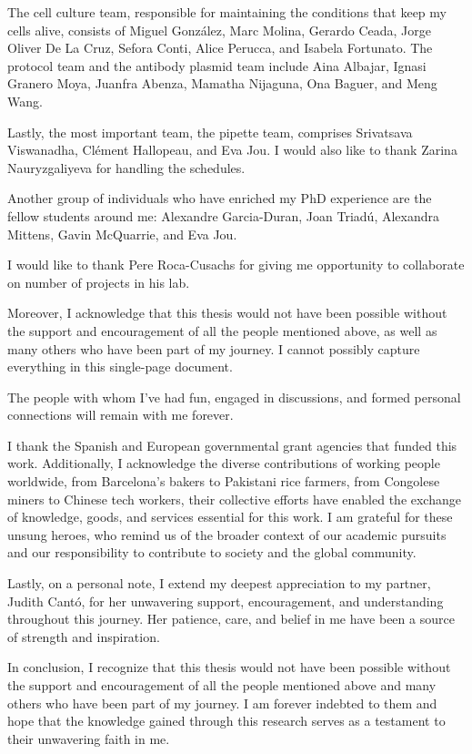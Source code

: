 \begin{Acknowledgements}
The cell culture team, responsible for maintaining the conditions that keep my cells alive, consists of Miguel González, Marc Molina, Gerardo Ceada, Jorge Oliver De La Cruz, Sefora Conti, Alice Perucca, and Isabela Fortunato. The protocol team and the antibody plasmid team include Aina Albajar, Ignasi Granero Moya, Juanfra Abenza, Mamatha Nijaguna, Ona Baguer, and Meng Wang.

Lastly, the most important team, the pipette team, comprises Srivatsava Viswanadha, Clément Hallopeau, and Eva Jou. I would also like to thank Zarina Nauryzgaliyeva for handling the schedules.
	
Another group of individuals who have enriched my PhD experience are the fellow students around me: Alexandre Garcia-Duran, Joan Triadú, Alexandra Mittens, Gavin McQuarrie, and Eva Jou.

I would like to thank Pere Roca-Cusachs for giving me opportunity to collaborate on number of projects in his lab.

Moreover, I acknowledge that this thesis would not have been possible without the support and encouragement of all the people mentioned above, as well as many others who have been part of my journey. I cannot possibly capture everything in this single-page document.

The people with whom I've had fun, engaged in discussions, and formed personal connections will remain with me forever.

I thank the Spanish and European governmental grant agencies that funded this work. Additionally, I acknowledge the diverse contributions of working people worldwide, from Barcelona's bakers to Pakistani rice farmers, from  Congolese miners to Chinese tech workers, their collective efforts have enabled the exchange of knowledge, goods, and services essential for this work. I am grateful for these unsung heroes, who remind us of the broader context of our academic pursuits and our responsibility to contribute to society and the global community.
	
Lastly, on a personal note, I extend my deepest appreciation to my partner, Judith Cantó, for her unwavering support, encouragement, and understanding throughout this journey. Her patience, care, and belief in me have been a source of strength and inspiration.

In conclusion, I recognize that this thesis would not have been possible without the support and encouragement of all the people mentioned above and many others who have been part of my journey. I am forever indebted to them and hope that the knowledge gained through this research serves as a testament to their unwavering faith in me.




	
	
	
	
	
	
	
	
	
	 
	
	
	
	
	
	
\end{Acknowledgements}
\cleardoublepage
